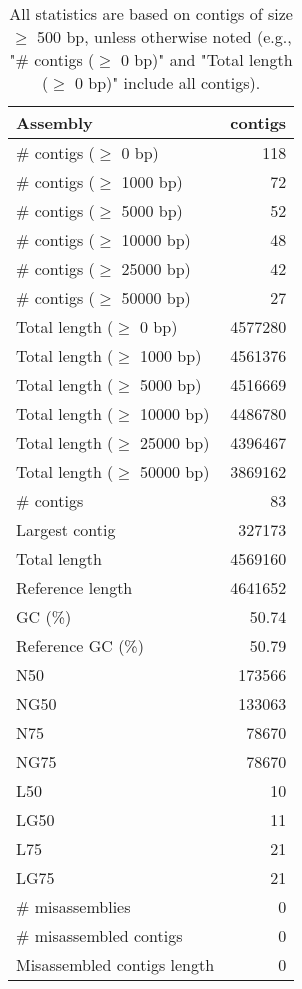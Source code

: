 \documentclass[12pt,a4paper]{article}
\begin{document}
\begin{table}[ht]
\begin{center}
\caption{All statistics are based on contigs of size $\geq$ 500 bp, unless otherwise noted (e.g., "\# contigs ($\geq$ 0 bp)" and "Total length ($\geq$ 0 bp)" include all contigs).}
\begin{tabular}{|l*{1}{|r}|}
\hline
Assembly & contigs \\ \hline
\# contigs ($\geq$ 0 bp) & 118 \\ \hline
\# contigs ($\geq$ 1000 bp) & 72 \\ \hline
\# contigs ($\geq$ 5000 bp) & 52 \\ \hline
\# contigs ($\geq$ 10000 bp) & 48 \\ \hline
\# contigs ($\geq$ 25000 bp) & 42 \\ \hline
\# contigs ($\geq$ 50000 bp) & 27 \\ \hline
Total length ($\geq$ 0 bp) & 4577280 \\ \hline
Total length ($\geq$ 1000 bp) & 4561376 \\ \hline
Total length ($\geq$ 5000 bp) & 4516669 \\ \hline
Total length ($\geq$ 10000 bp) & 4486780 \\ \hline
Total length ($\geq$ 25000 bp) & 4396467 \\ \hline
Total length ($\geq$ 50000 bp) & 3869162 \\ \hline
\# contigs & 83 \\ \hline
Largest contig & 327173 \\ \hline
Total length & 4569160 \\ \hline
Reference length & 4641652 \\ \hline
GC (\%) & 50.74 \\ \hline
Reference GC (\%) & 50.79 \\ \hline
N50 & 173566 \\ \hline
NG50 & 133063 \\ \hline
N75 & 78670 \\ \hline
NG75 & 78670 \\ \hline
L50 & 10 \\ \hline
LG50 & 11 \\ \hline
L75 & 21 \\ \hline
LG75 & 21 \\ \hline
\# misassemblies & 0 \\ \hline
\# misassembled contigs & 0 \\ \hline
Misassembled contigs length & 0 \\ \hline

\end{tabular}
\end{center}
\end{table}
\end{document}
